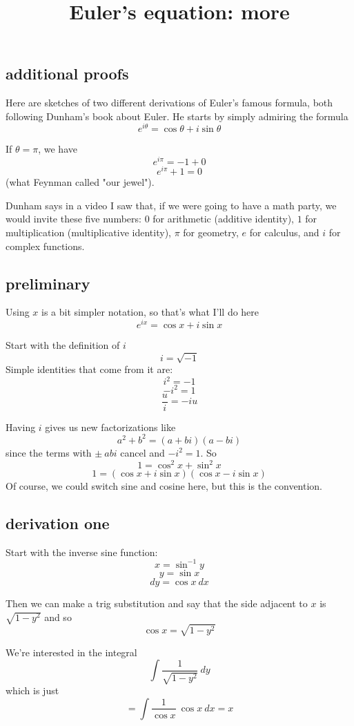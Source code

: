 \documentclass[11pt, oneside]{article}
\title{Euler's equation:  more}
\date{}
\begin{document}
\maketitle
\Large

\label{sec:Euler's_equation}

\subsection*{additional proofs}
Here are sketches of two different derivations of Euler's famous formula, both following Dunham's book about Euler.  He starts by simply admiring the formula
\[ e^{i\theta} = \cos \theta + i \sin \theta \]

If $\theta = \pi$, we have
\[ e^{i\pi} = -1 + 0 \]
\[ e^{i\pi}+ 1 = 0 \]
(what Feynman called "our jewel").

Dunham says in a video I saw that, if we were going to have a math party, we would invite these five numbers:  $0$ for arithmetic (additive identity), $1$ for multiplication (multiplicative identity), $\pi$ for geometry, $e$ for calculus, and $i$ for complex functions.

\subsection*{preliminary}
Using $x$ is a bit simpler notation, so that's what I'll do here
\[ e^{ix} = \cos x + i \sin x \]

Start with the definition of $i$
\[ i = \sqrt{-1} \]
Simple identities that come from it are:
\[ i^2 = - 1 \]
\[ -i^2 = 1 \]
\[ \frac{u}{i} = - i u \]

Having $i$ gives us new factorizations like
\[ a^2 + b^2 = (a + bi)(a - bi) \]
since the terms with $\pm \ abi$ cancel and $- i^2 = 1$.  
So
\[ 1 = \cos^2 x + \sin^2 x \]
\[ 1 = (\cos x + i \sin x) (\cos x - i \sin x) \]
Of course, we could switch sine and cosine here, but this is the convention.

\subsection*{derivation one}
Start with the inverse sine function:
\[ x = \sin^{-1} y \]
\[ y = \sin x \]
\[ dy = \cos x \ dx \]

Then we can make a trig substitution and say that the side adjacent to $x$ is $\sqrt{1-y^2}$ and so
\[ \cos x = \sqrt{1-y^2} \]

We're interested in the integral
\[ \int \frac{1}{\sqrt{1-y^2}} \ dy \]
which is just
\[ = \int \frac{1}{\cos x} \ \cos x \ dx = x \]
\end{document}
